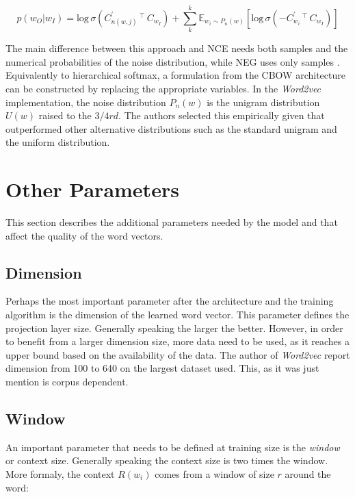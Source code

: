\begin{equation}
  p(w_O|w_I)  =  \text{log}\,\sigma\left(C^{'}_{n(w,j)}  \,^\top\, C_{w_I}
  \right) + \sum^{k}_k\mathbb{E}_{w_{i}\sim P_{n}(w)}\left[
    \text{log}\,\sigma\left(-C^{'}_{w_i}  \,^\top\,  C_{w_I} \right)  \right]
\end{equation}

The main difference between this approach and \ac{NCE}  needs both
samples and the numerical probabilities of the noise distribution, while \ac{NEG} uses only
samples \cite{MikolovSCCD13}.  Equivalently to  hierarchical softmax, a formulation from  the \ac{CBOW}
 architecture can be constructed by replacing the appropriate variables.
In the \textit{Word2vec} implementation, the
noise distribution  $P_n(w)$ is the unigram distribution $U(w)$ raised to the
$3/4rd$. The authors selected this  empirically given that outperformed
other alternative distributions such as the standard unigram and the uniform
distribution. 



\section{Other Parameters}
\label{sec:w2v_other_paramters}
This section describes the additional parameters needed by the model and that
affect the quality of the word vectors.


\subsection{Dimension }
\label{sec:w2v-param-dim}
Perhaps the most important parameter after the architecture and the training
algorithm is the dimension of the learned word vector.  This parameter defines
the projection layer size. Generally speaking the larger the better.
However, in order to benefit from a larger dimension size, more data need to
be used, as it  reaches a upper bound based on the availability of the data.
The author of \textit{Word2vec} report dimension from 100 to 640 on the
largest dataset used. This, as it was just mention is corpus dependent.


\subsection{Window}
\label{sec:w2v-params-win}

An important parameter that needs to be defined at training size is the
\textit{window} or context size. Generally speaking the context size is two
times the window. More formaly, the context $R(w_i)$ comes from a window of
size $r$ around the word:


